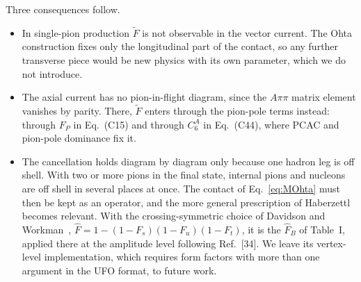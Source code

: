 Three consequences follow.
\begin{itemize}
\item In single-pion production $\widetilde F$ is not observable in the vector
  current. The Ohta construction fixes only the longitudinal part of the
  contact, so any further transverse piece would be new physics with its own
  parameter, which we do not introduce.
\item The axial current has no pion-in-flight diagram, since the $A\pi\pi$
  matrix element vanishes by parity. There, $\widetilde F$ enters through the
  pion-pole terms instead: through $F_P$ in Eq.~(C15) and through $C_6^A$ in
  Eq.~(C44), where PCAC and pion-pole dominance fix it.
\item The cancellation holds diagram by diagram only because one hadron leg is
  off shell. With two or more pions in the final state, internal pions and
  nucleons are off shell in several places at once. The contact of
  Eq.~\eqref{eq:MOhta} must then be kept as an operator, and the more general
  prescription of Haberzettl~\cite{Haberzettl:1997,Haberzettl:1998} becomes
  relevant. With the crossing-symmetric choice of Davidson and
  Workman~\cite{Davidson:2001},
  $\hat F = 1 - (1-F_s)(1-F_u)(1-F_t)$, it is the $\hat F_B$ of
  Table~I, applied there at the amplitude level following Ref.~[34]. We leave
  its vertex-level implementation, which requires form factors with more than
  one argument in the UFO format, to future work.
\end{itemize}
